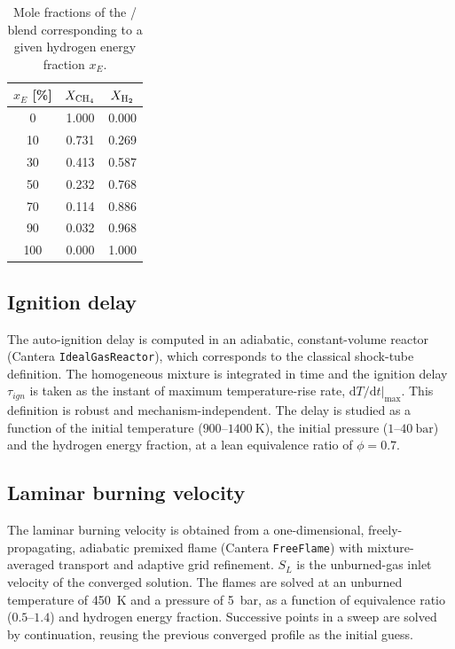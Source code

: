 \documentclass[11pt,a4paper]{article}
\begin{document}
\begin{table}[h]
\centering
\caption{Mole fractions of the / blend corresponding to a
given hydrogen energy fraction $x_E$.}
\label{tab:blend}
\begin{tabular}{ccc}
\toprule
$x_E$ [\%] & $X_{\ce{CH4}}$ & $X_{\ce{H2}}$ \\
\midrule
0   & 1.000 & 0.000 \\
10  & 0.731 & 0.269 \\
30  & 0.413 & 0.587 \\
50  & 0.232 & 0.768 \\
70  & 0.114 & 0.886 \\
90  & 0.032 & 0.968 \\
100 & 0.000 & 1.000 \\
\bottomrule
\end{tabular}
\end{table}

\subsection{Ignition delay}

The auto-ignition delay is computed in an adiabatic, constant-volume reactor
(Cantera \texttt{IdealGasReactor}), which corresponds to the classical
shock-tube definition. The homogeneous mixture is integrated in time and the
ignition delay $\tau_{ign}$ is taken as the instant of maximum
temperature-rise rate, $\mathrm{d}T/\mathrm{d}t|_{\max}$. This definition is
robust and mechanism-independent. The delay is studied as a function of the
initial temperature ($900$--$\SI{1400}{\kelvin}$), the initial pressure
($1$--$\SI{40}{\bar}$) and the hydrogen energy fraction, at a lean
equivalence ratio of $\phi=0.7$.

\subsection{Laminar burning velocity}

The laminar burning velocity is obtained from a one-dimensional,
freely-propagating, adiabatic premixed flame (Cantera \texttt{FreeFlame})
with mixture-averaged transport and adaptive grid refinement. $S_L$ is the
unburned-gas inlet velocity of the converged solution. The flames are solved
at an unburned temperature of \SI{450}{\kelvin} and a pressure of
\SI{5}{\bar}, as a function of equivalence ratio ($0.5$--$1.4$) and hydrogen
energy fraction. Successive points in a sweep are solved by continuation,
reusing the previous converged profile as the initial guess.
\end{document}

